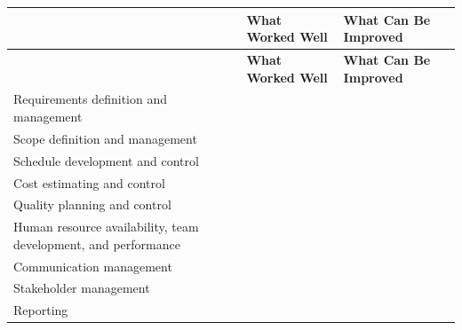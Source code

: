 \documentclass[10pt,letterpaper]{article}
\renewcommand\arraystretch{1.25}
\begin{document}
\begin{center}
\begingroup
\setlength\tabcolsep{2.0pt}
\footnotesize
\renewcommand\arraystretch{1.55}
\begin{longtable}{|>{\raggedright\arraybackslash}p{2.120in}|>{\raggedright\arraybackslash}p{2.120in}|>{\raggedright\arraybackslash}p{2.120in}|}
\hline
\rowcolor{light}
\rule{0pt}{11pt}\hspace{0pt} & \textbf{What Worked Well} & \textbf{What Can Be Improved} \\ \hline
\endfirsthead
\hline\rowcolor{light} \rule{0pt}{11pt}\hspace{0pt} & \textbf{What Worked Well} & \textbf{What Can Be Improved} \\ \hline
\endhead
Requirements definition and management & \rule{0pt}{11pt}\hspace{0pt} & \rule{0pt}{11pt}\hspace{0pt} \\ \hline
Scope definition and management & \rule{0pt}{11pt}\hspace{0pt} & \rule{0pt}{11pt}\hspace{0pt} \\ \hline
Schedule development and control & \rule{0pt}{11pt}\hspace{0pt} & \rule{0pt}{11pt}\hspace{0pt} \\ \hline
Cost estimating and control & \rule{0pt}{11pt}\hspace{0pt} & \rule{0pt}{11pt}\hspace{0pt} \\ \hline
Quality planning and control & \rule{0pt}{11pt}\hspace{0pt} & \rule{0pt}{11pt}\hspace{0pt} \\ \hline
Human resource availability, team development, and performance & \rule{0pt}{11pt}\hspace{0pt} & \rule{0pt}{11pt}\hspace{0pt} \\ \hline
Communication management & \rule{0pt}{11pt}\hspace{0pt} & \rule{0pt}{11pt}\hspace{0pt} \\ \hline
Stakeholder management & \rule{0pt}{11pt}\hspace{0pt} & \rule{0pt}{11pt}\hspace{0pt} \\ \hline
Reporting & \rule{0pt}{11pt}\hspace{0pt} & \rule{0pt}{11pt}\hspace{0pt} \\ \hline

\end{longtable}
\end{center}
\end{document}
